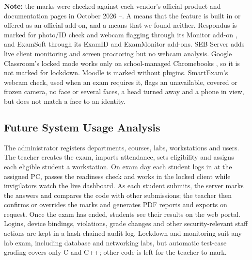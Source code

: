 \noindent\textbf{Note:} the marks were checked against each vendor's official product and documentation pages in October 2026 \cite{respondus1}--\cite{gclassroom_quiz}. A \cmark{} means that the feature is built in or offered as an official add-on, and a \xmark{} means that we found neither. Respondus is marked for photo/ID check and webcam flagging through its Monitor add-on \cite{respondus_webcam}, and ExamSoft through its ExamID and ExamMonitor add-ons. SEB Server adds live client monitoring and screen proctoring but no webcam analysis. Google Classroom's locked mode works only on school-managed Chromebooks \cite{gclassroom_quiz}, so it is not marked for lockdown. Moodle is marked without plugins. SmartExam's webcam check, used when an exam requires it, flags an unavailable, covered or frozen camera, no face or several faces, a head turned away and a phone in view, but does not match a face to an identity.

\subsection{Future System Usage Analysis}

The administrator registers departments, courses, labs, workstations and users. The teacher creates the exam, imports attendance, sets eligibility and assigns each eligible student a workstation. On exam day each student logs in at the assigned PC, passes the readiness check and works in the locked client while invigilators watch the live dashboard. As each student submits, the server marks the answers and compares the code with other submissions; the teacher then confirms or overrides the marks and generates PDF reports and exports on request. Once the exam has ended, students see their results on the web portal. Logins, device bindings, violations, grade changes and other security-relevant staff actions are kept in a hash-chained audit log. Lockdown and monitoring suit any lab exam, including database and networking labs, but automatic test-case grading covers only C and C++; other code is left for the teacher to mark.
